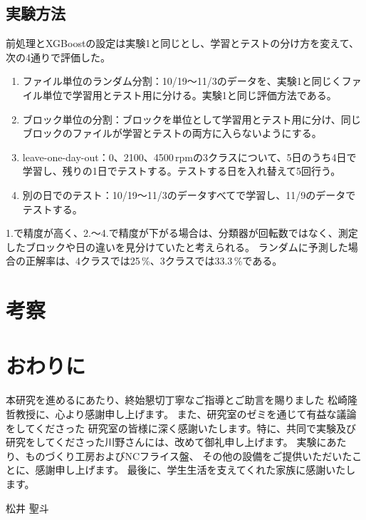 \documentclass[uplatex, 12pt]{ujbook}
\begin{document}
\section{実験方法}
前処理とXGBoostの設定は実験1と同じとし、学習とテストの分け方を変えて、次の4通りで評価した。
\begin{enumerate}
  \item ファイル単位のランダム分割：10/19〜11/3のデータを、実験1と同じくファイル単位で学習用とテスト用に分ける。実験1と同じ評価方法である。
  \item ブロック単位の分割：ブロックを単位として学習用とテスト用に分け、同じブロックのファイルが学習とテストの両方に入らないようにする。
  \item leave-one-day-out：0、2100、4500\,rpmの3クラスについて、5日のうち4日で学習し、残りの1日でテストする。テストする日を入れ替えて5回行う。
  \item 別の日でのテスト：10/19〜11/3のデータすべてで学習し、11/9のデータでテストする。
\end{enumerate}
1.で精度が高く、2.〜4.で精度が下がる場合は、分類器が回転数ではなく、測定したブロックや日の違いを見分けていたと考えられる。
ランダムに予測した場合の正解率は、4クラスでは25\,\%、3クラスでは33.3\,\%である。

\chapter{考察}

\chapter{おわりに}

\acknowledgment

本研究を進めるにあたり、終始懇切丁寧なご指導とご助言を賜りました 松崎隆哲教授に、心より感謝申し上げます。
また、研究室のゼミを通じて有益な議論をしてくださった
研究室の皆様に深く感謝いたします。特に、共同で実験及び研究をしてくださった川野さんには、改めて御礼申し上げます。
実験にあたり、ものづくり工房およびNCフライス盤、
その他の設備をご提供いただいたことに、感謝申し上げます。
最後に、学生生活を支えてくれた家族に感謝いたします。

松井 聖斗

\end{document}

